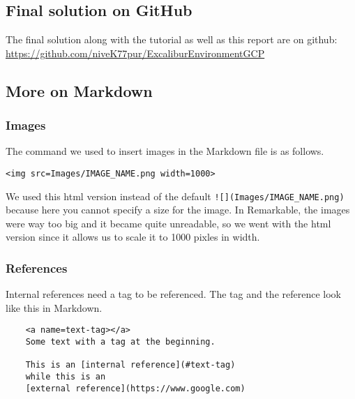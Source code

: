 \subsection{Final solution on GitHub}\label{app:github}

The final solution along with the tutorial as well as this report are
on github: \url{https://github.com/niveK77pur/ExcaliburEnvironmentGCP}

\subsection{More on Markdown}\label{app:markdown}

\subsubsection{Images}

The command we used to insert
images in the Markdown file is as follows.

\begin{verbatim}
<img src=Images/IMAGE_NAME.png width=1000>
\end{verbatim}

We used this html version instead of the default
\verb|![](Images/IMAGE_NAME.png)| because here you cannot specify a
size for the image. In Remarkable, the images were way too big and it
became quite unreadable, so we went with the html version since it
allows us to scale it to 1000 pixles in width.

\subsubsection{References}

Internal references need a tag to be
referenced. The tag and the reference look like this in Markdown.

\begin{verbatim}
	<a name=text-tag></a>
	Some text with a tag at the beginning.

	This is an [internal reference](#text-tag)
	while this is an
	[external reference](https://www.google.com)
\end{verbatim}


